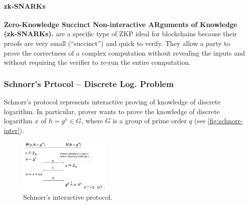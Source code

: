 
\paragraph{zk-SNARKs}\label{zk-snarks}

\textbf{Zero-Knowledge Succinct Non-interactive ARguments of Knowledge
(zk-SNARKs).} are a specific type of ZKP ideal for blockchains because
their proofs are very small (``succinct'') and quick to verify. They
allow a party to prove the correctness of a complex computation without
revealing the inputs and without requiring the verifier to re-run the
entire computation.
%

\subsubsection{Schnorr's Prtocol -- Discrete Log. Problem}\label{sec:schnorr}
Schnorr's protocol represents interactive proving of knowledge of discrete logarithm.
In particular, prover wants to prove the knowledge of discrete logarithm $x$ of
$h = g^x \in G$, where $G$ is a group of prime order $q$ (see \autoref{fig:schnorr-inter}).

\begin{figure}[h]
	\begin{center}
		\includegraphics[width=0.4\textwidth]{./figs/schnor-inter.png}
		\caption{Schnorr's interactive protocol.}		
		\label{fig:schnorr-inter}
	\end{center}	
\end{figure}


